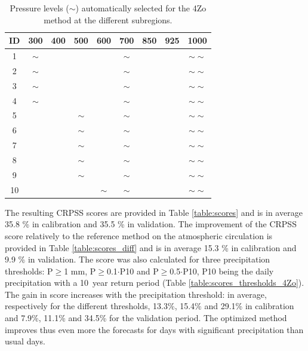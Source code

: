 \documentclass[5p]{elsarticle}
\begin{document}
\begin{table}[htbp]
	\caption{Pressure levels ($\sim$) automatically selected for the 4Zo method at the different subregions.}
	\footnotesize
	\begin{center}
		\begin{tabular}{ccccccccc}
			\hline ID & 300 & 400 & 500 & 600 & 700 & 850 & 925 & 1000 \\ 
			\hline 
			1  & $\sim$ &   &   &   & $\sim$ &   &   & $\sim \sim$ \\
			2  & $\sim$ &   &   &   & $\sim$ &   &   & $\sim \sim$ \\
			3  & $\sim$ &   &   &   & $\sim$ &   &   & $\sim \sim$ \\
			4  & $\sim$ &   &   &   & $\sim$ &   &   & $\sim \sim$ \\
			5  &   &   & $\sim$ &   & $\sim$ &   &   & $\sim \sim$ \\
			6  &   &   & $\sim$ &   & $\sim$ &   &   & $\sim \sim$ \\
			7  &   &   & $\sim$ &   & $\sim$ &   &   & $\sim \sim$ \\
			8  &   &   & $\sim$ &   & $\sim$ &   &   & $\sim \sim$ \\
			9  &   &   & $\sim$ &   & $\sim$ &   &   & $\sim \sim$ \\
			10 &   &   &   & $\sim$ & $\sim$ &   &   & $\sim \sim$ \\
			\hline 
		\end{tabular} 
	\end{center}
	\label{table:levels_GA_4Zo}
\end{table}


The resulting CRPSS scores are provided in Table \ref{table:scores} and is in average 35.8 \% in calibration and 35.5 \% in validation. The improvement of the CRPSS score relatively to the reference method on the atmospheric circulation is provided in Table \ref{table:scores_diff} and is in average 15.3 \% in calibration and 9.9 \% in validation. The score was also calculated for three precipitation thresholds: P\(\geq\)1 mm, P\(\geq\)0.1\(\cdot\)P10 and P\(\geq\)0.5\(\cdot\)P10, P10 being the daily precipitation with a 10~year return period (Table \ref{table:scores_thresholds_4Zo}). The gain in score increases with the precipitation threshold: in average, respectively for the different thresholds, 13.3\%, 15.4\% and 29.1\% in calibration and 7.9\%, 11.1\% and 34.5\% for the validation period. The optimized method improves thus even more the forecasts for days with significant precipitation than usual days.
\end{document}
